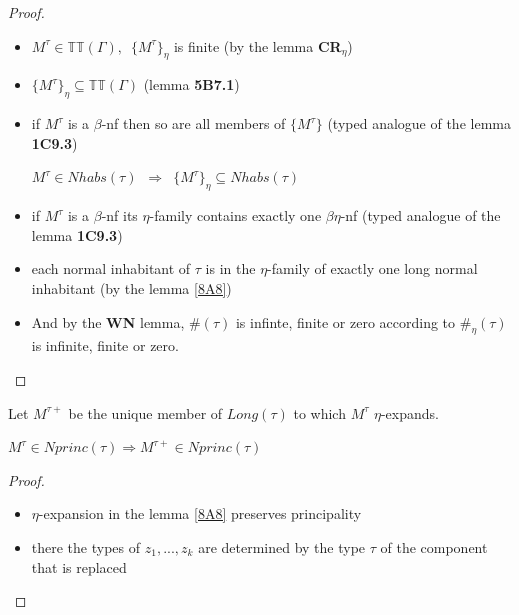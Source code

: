 \begin{frame}

\begin{proof}
 \begin{itemize}
  \item $M^{\tau} \in \mathbb{TT}(\Gamma), \,\,\,\{M^{\tau}\}_{\eta}$ is finite (by the lemma \textbf{CR}$_{\eta}$) 
  \item $\{M^{\tau}\}_{\eta} \subseteq \mathbb{TT}(\Gamma)$ (lemma \textbf{5B7.1})
  \item if $M^{\tau}$ is a $\beta$-nf then so are all members of $\{M^{\tau}\}$ (typed analogue of the lemma \textbf{1C9.3})
 \begin{center}
  $M^{\tau} \in Nhabs(\tau) \,\,\,\Longrightarrow \,\,\,\{M^{\tau}\}_{\eta} \subseteq Nhabs(\tau)$
 \end{center}
  \item if $M^{\tau}$ is a $\beta$-nf its $\eta$-family contains exactly one $\beta\eta$-nf (typed analogue of the lemma \textbf{1C9.3})
  \item each normal inhabitant of $\tau$ is in the $\eta$-family of exactly one long normal inhabitant (by the lemma \ref{8A8})
  \item And by the \textbf{WN} lemma, $\#(\tau)$ is infinte, finite or zero according to  $\#_\eta(\tau)$ is infinite, finite or zero.
 \end{itemize}
 \end{proof}
 
 
\end{frame}


\begin{frame}
 \begin{lem}
    Let $M^{\tau+}$ be the unique member of $Long(\tau)$ to which
    $M^{\tau}$ $\eta$-expands. 

  \begin{center}
       $M^{\tau} \in Nprinc(\tau) \Longrightarrow M^{\tau+} \in Nprinc(\tau)$
   \end{center}
\end{lem}

\begin{proof}
\begin{itemize}
  \item $\eta$-expansion in the lemma \ref{8A8} preserves principality
  \item there the types of $z_1, ..., z_k$ are determined by the type $\tau$ of the component that is replaced 
\end{itemize}
 
\end{proof}

\end{frame}

